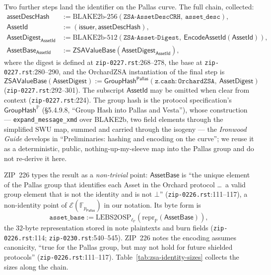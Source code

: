 \documentclass[11pt,a4paper]{article}
\theoremstyle{definition}
\newcommand{\F}{\mathbb{F}}
\newcommand{\PP}{\mathbb{P}}
\newcommand{\Pallas}{\ensuremath{\mathsf{Pallas}}}
\newcommand{\Ep}{\ensuremath{\mathcal{E}}}
\newcommand{\GroupHash}{\ensuremath{\mathsf{GroupHash}}}
\begin{document}
Two further steps land the identifier on the Pallas curve. The full chain,
collected:
\begin{align*}
\mathsf{assetDescHash} &:=
  \mathrm{BLAKE2b\text{-}256}(\texttt{ZSA-AssetDescCRH},\
  \texttt{asset\_desc}), \\
\mathsf{AssetId} &:= (\mathsf{issuer}, \mathsf{assetDescHash}), \\
\mathsf{AssetDigest}_{\mathsf{AssetId}} &:=
  \mathrm{BLAKE2b\text{-}512}(\texttt{ZSA-Asset-Digest},\
  \mathsf{EncodeAssetId}(\mathsf{AssetId})), \\
\mathsf{AssetBase}_{\mathsf{AssetId}} &:=
  \mathsf{ZSAValueBase}(\mathsf{AssetDigest}_{\mathsf{AssetId}}),
\end{align*}
where the digest is defined at \texttt{zip-0227.rst}:268--278, the base at
\texttt{zip-0227.rst}:280--290, and the OrchardZSA instantiation of the
final step is
\[
\mathsf{ZSAValueBase}(\mathsf{AssetDigest}) :=
\GroupHash^{\Pallas}(\mathtt{z.cash:OrchardZSA},\ \mathsf{AssetDigest})
\]
(\texttt{zip-0227.rst}:292--301). The subscript $\mathsf{AssetId}$ may be
omitted when clear from context (\texttt{zip-0227.rst}:224). The
group hash is the protocol specification's
$\GroupHash^{\PP}$ (\S5.4.9.8, ``Group Hash into Pallas and Vesta''),
whose construction --- \texttt{expand\_message\_xmd} over BLAKE2b, two
field elements through the simplified SWU map, summed and carried through
the isogeny --- the \emph{Ironwood Guide} develops in ``Preliminaries:
hashing and encoding on the curve''; we reuse it as a deterministic,
public, nothing-up-my-sleeve map into the Pallas group and do not
re-derive it here.

ZIP~226 types the result as a \emph{non-trivial} point:
$\mathsf{AssetBase}$ is ``the unique element of the Pallas group that
identifies each Asset in the Orchard protocol \dots\ a valid group element
that is not the identity and is not $\bot$''
(\texttt{zip-0226.rst}:111--117), a non-identity point of
$\Ep(\F_{p_{\Pallas}})$ in our notation. Its byte form is
\[
\texttt{asset\_base} :=
\mathrm{LEBS2OSP}_{\ell_{\PP}}(\mathrm{repr}_{\PP}(\mathsf{AssetBase})),
\]
the $32$-byte representation stored in note plaintexts and burn fields
(\texttt{zip-0226.rst}:114; \texttt{zip-0230.rst}:540--545). ZIP~226 notes
the encoding assumes canonicity, ``true for the Pallas group, but may not
hold for future shielded protocols'' (\texttt{zip-0226.rst}:111--117).
Table~\ref{tab:zsa-identity-sizes} collects the sizes along the chain.
\end{document}
